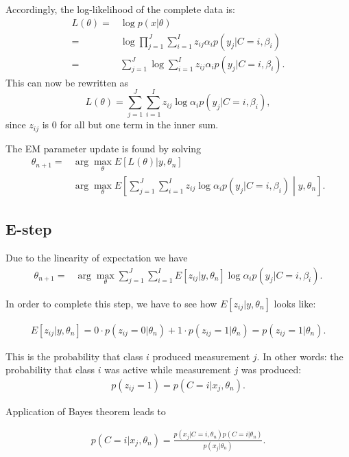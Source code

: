 \documentclass{article}  %
\begin{document}
Accordingly, the log-likelihood of the complete data is:
\begin{align*}
L(\theta) = & \log p(x|\theta)\\
= &\log\prod_{j=1}^J\sum_{i=1}^I z_{ij}\alpha_i p(y_j|C=i,\beta_i)\\
= &\sum_{j=1}^J\log\sum_{i=1}^I z_{ij}\alpha_i p(y_j|C=i,\beta_i).
\end{align*}
This can now be rewritten as
\[
L(\theta)=\sum_{j=1}^J\sum_{i=1}^I z_{ij}\log\alpha_i p(y_j|C=i,\beta_i),
\]
since $z_{ij}$ is 0 for all but one term in the inner sum.

The EM parameter update is found by solving
\begin{align*}
\theta_{n+1} = &\arg\max_{\theta} E\left[ L(\theta)|y,\theta_n\right]\\
&\arg\max_{\theta}E\left[\sum_{j=1}^J\sum_{i=1}^I z_{ij}\log\alpha_i
p(y_j|C=i,\beta_i)\middle|y,\theta_n\right].
\end{align*}

\subsection{E-step}

Due to the linearity of expectation we have
\begin{align}
\theta_{n+1}
 =&\arg\max_{\theta}\sum_{j=1}^J\sum_{i=1}^I
E[z_{ij}|y,\theta_n]\log\alpha_i p(y_j|C=i,\beta_i). \label{eqn:extension_estep} 
\end{align}

In order to complete this step, we have to see how $E[z_{ij}|y,\theta_n]$ looks
like:

\begin{align*}
E[z_{ij}|y,\theta_n]=0\cdot p(z_{ij}=0|\theta_n) + 1\cdot
p(z_{ij}=1|\theta_n)=p(z_{ij}=1|\theta_n).
\end{align*}

This is the probability that class $i$ produced measurement $j$. In other words:
the probability that class $i$ was active while measurement $j$ was produced:
\begin{align*}
p(z_{ij}=1) = p(C=i|x_j, \theta_n).
\end{align*}

Application of Bayes theorem leads to

\begin{align*}
p(C=i|x_j, \theta_n) =
\frac{p(x_j|C=i,\theta_n)p(C=i|\theta_n)}{p(x_j|\theta_n)}.
\end{align*}
\end{document}
